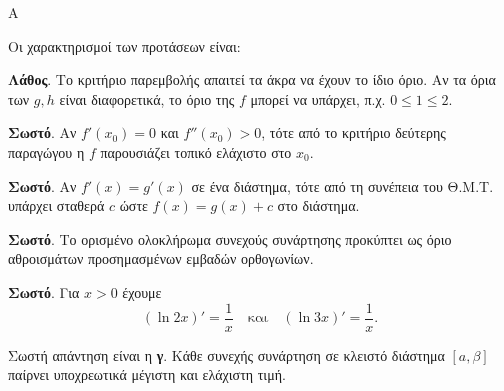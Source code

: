 \begin{thema}{Α}
\begin{erwthma}
\item {}

\item {}

\item {}

\item Οι χαρακτηρισμοί των προτάσεων είναι:
\begin{alist}
\item \textbf{Λάθος}. Το κριτήριο παρεμβολής απαιτεί τα άκρα να έχουν το ίδιο όριο. Αν τα όρια των $g,h$ είναι διαφορετικά, το όριο της $f$ μπορεί να υπάρχει, π.χ. $0\le1\le2$.
\item \textbf{Σωστό}. Αν $f'(x_0)=0$ και $f''(x_0)>0$, τότε από το κριτήριο δεύτερης παραγώγου η $f$ παρουσιάζει τοπικό ελάχιστο στο $x_0$.
\item \textbf{Σωστό}. Αν $f'(x)=g'(x)$ σε ένα διάστημα, τότε από τη συνέπεια του Θ.Μ.Τ. υπάρχει σταθερά $c$ ώστε $f(x)=g(x)+c$ στο διάστημα.
\item \textbf{Σωστό}. Το ορισμένο ολοκλήρωμα συνεχούς συνάρτησης προκύπτει ως όριο αθροισμάτων προσημασμένων εμβαδών ορθογωνίων.
\item \textbf{Σωστό}. Για $x>0$ έχουμε
\[ \left(\ln{2x}\right)'=\dfrac{1}{x}
\quad\textrm{και}\quad
\left(\ln{3x}\right)'=\dfrac{1}{x}. \]
\end{alist}

\item Σωστή απάντηση είναι η \textbf{γ}. Κάθε συνεχής συνάρτηση σε κλειστό διάστημα $[a,\beta]$ παίρνει υποχρεωτικά μέγιστη και ελάχιστη τιμή.
\end{erwthma}
\end{thema}


